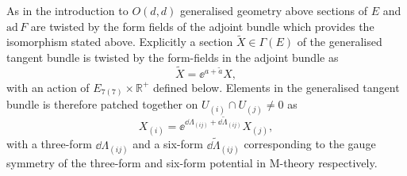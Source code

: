 As in the introduction to $O(d,d)$ generalised geometry above sections of $E$ and $\text{ad}\,F$ are twisted by the form fields of the adjoint bundle which provides the isomorphism stated above. Explicitly a section $\tilde{X}\in \Gamma(E)$ of the generalised tangent bundle is twisted by the form-fields in the adjoint bundle as
\begin{equation}
    \tilde{X} = \ee^{a+\tilde{a}}X,
\end{equation}
with an action of $E_{7(7)}\times\mathbb{R}^+$ defined below. Elements in the generalised tangent bundle is therefore patched together on $U_{(i)}\cap U_{(j)}\neq 0$ as 
\begin{equation}
    X_{(i)} = \ee^{\dd\Lambda_{(ij)}+\dd\tilde{\Lambda}_{(ij)}}X_{(j)},
\end{equation}
with a three-form $\dd \Lambda_{(ij)}$  and a six-form $\dd\tilde{\Lambda}_{(ij)}$ corresponding to the gauge symmetry of the three-form and six-form potential in M-theory respectively. 


